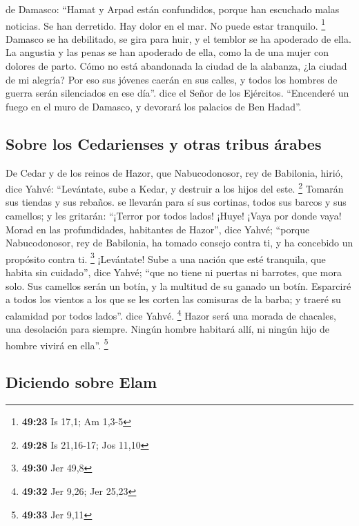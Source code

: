  de Damasco: ``Hamat y Arpad están confundidos, porque
han escuchado malas noticias. Se han derretido. Hay dolor en el mar. No
puede estar tranquilo. \footnote{\textbf{49:23} Is 17,1; Am 1,3-5}
 Damasco se ha debilitado, se gira para huir, y el
temblor se ha apoderado de ella. La angustia y las penas se han
apoderado de ella, como la de una mujer con dolores de parto.
 Cómo no está abandonada la ciudad de la alabanza, ¿la
ciudad de mi alegría?  Por eso sus jóvenes caerán en sus
calles, y todos los hombres de guerra serán silenciados en ese día''.
dice el Señor de los Ejércitos.  ``Encenderé un fuego en
el muro de Damasco, y devorará los palacios de Ben Hadad''.

\hypertarget{sobre-los-cedarienses-y-otras-tribus-uxe1rabes}{%
\subsection{Sobre los Cedarienses y otras tribus
árabes}\label{sobre-los-cedarienses-y-otras-tribus-uxe1rabes}}

 De Cedar y de los reinos de Hazor, que Nabucodonosor,
rey de Babilonia, hirió, dice Yahvé: ``Levántate, sube a Kedar, y
destruir a los hijos del este. \footnote{\textbf{49:28} Is 21,16-17; Jos
  11,10}  Tomarán sus tiendas y sus rebaños. se llevarán
para sí sus cortinas, todos sus barcos y sus camellos; y les gritarán:
``¡Terror por todos lados!  ¡Huye! ¡Vaya por donde vaya!
Morad en las profundidades, habitantes de Hazor'', dice Yahvé; ``porque
Nabucodonosor, rey de Babilonia, ha tomado consejo contra ti, y ha
concebido un propósito contra ti. \footnote{\textbf{49:30} Jer 49,8}
 ¡Levántate! Sube a una nación que esté tranquila, que
habita sin cuidado'', dice Yahvé; ``que no tiene ni puertas ni barrotes,
que mora solo.  Sus camellos serán un botín, y la
multitud de su ganado un botín. Esparciré a todos los vientos a los que
se les corten las comisuras de la barba; y traeré su calamidad por todos
lados''. dice Yahvé. \footnote{\textbf{49:32} Jer 9,26; Jer 25,23}
 Hazor será una morada de chacales, una desolación para
siempre. Ningún hombre habitará allí, ni ningún hijo de hombre vivirá en
ella''. \footnote{\textbf{49:33} Jer 9,11}

\hypertarget{diciendo-sobre-elam}{%
\subsection{Diciendo sobre Elam}\label{diciendo-sobre-elam}}

